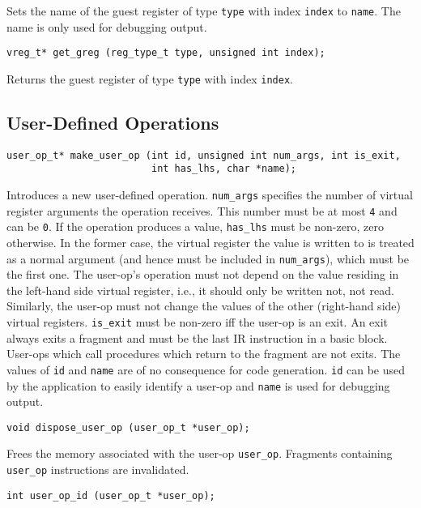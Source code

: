 \documentclass{article}
\newcommand{\cc}[1]{\texttt{#1}} %
\begin{document}
Sets the name of the guest register of type \cc{type} with index
\cc{index} to \cc{name}.  The name is only used for debugging output.

\begin{verbatim}
vreg_t* get_greg (reg_type_t type, unsigned int index);
\end{verbatim}

Returns the guest register of type \cc{type} with index \cc{index}.

\subsection{User-Defined Operations}

\begin{verbatim}
user_op_t* make_user_op (int id, unsigned int num_args, int is_exit,
                         int has_lhs, char *name);
\end{verbatim}

Introduces a new user-defined operation.  \cc{num\_args} specifies the
number of virtual register arguments the operation receives.  This
number must be at most \cc{4} and can be \cc{0}.  If the operation
produces a value, \cc{has\_lhs} must be non-zero, zero otherwise.  In
the former case, the virtual register the value is written to is
treated as a normal argument (and hence must be included in
\cc{num\_args}), which must be the first one.  The user-op's operation
must not depend on the value residing in the left-hand side virtual
register, i.e., it should only be written not, not read.  Similarly,
the user-op must not change the values of the other (right-hand side)
virtual registers.  \cc{is\_exit} must be non-zero iff the user-op is
an exit.  An exit always exits a fragment and must be the last IR
instruction in a basic block.  User-ops which call procedures which
return to the fragment are not exits.  The values of \cc{id} and
\cc{name} are of no consequence for code generation.  \cc{id} can be
used by the application to easily identify a user-op and \cc{name} is
used for debugging output.

\begin{verbatim}
void dispose_user_op (user_op_t *user_op);
\end{verbatim}

Frees the memory associated with the user-op \cc{user\_op}.  Fragments
containing \cc{user\_op} instructions are invalidated.

\begin{verbatim}
int user_op_id (user_op_t *user_op);
\end{verbatim}
\end{document}
